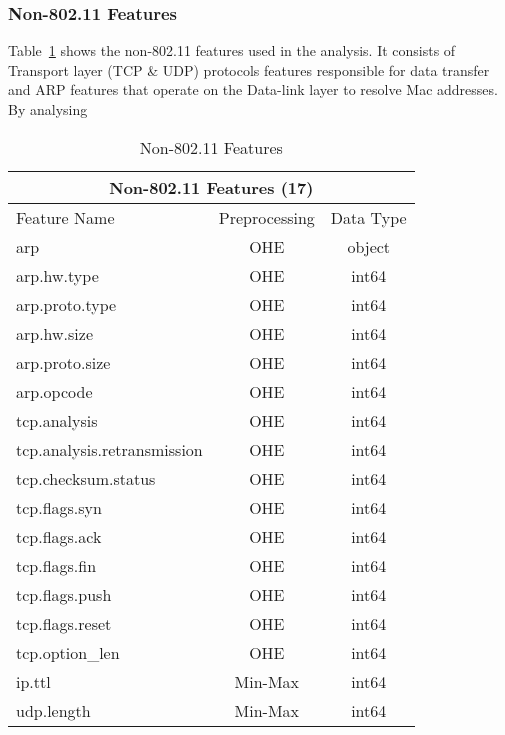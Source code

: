 \subsubsection{Non-802.11 Features}

Table~\ref{tab:non80211} shows the non-802.11 features used in the analysis. It consists of Transport layer (TCP \& UDP) protocols features responsible for data transfer and ARP features that operate on the Data-link layer to resolve Mac addresses. By analysing 

\begin{table}[H]
\begin{tabular}{lcc}
\hline
\multicolumn{3}{c}{\textbf{Non-802.11 Features (17)}} \\ \hline
Feature Name & Preprocessing & Data Type \\ \hline
arp & OHE & object \\
arp.hw.type & OHE & int64 \\
arp.proto.type & OHE & int64 \\
arp.hw.size & OHE & int64 \\
arp.proto.size & OHE & int64 \\
arp.opcode & OHE & int64 \\
tcp.analysis & OHE & int64 \\
tcp.analysis.retransmission & OHE & int64 \\
tcp.checksum.status & OHE & int64 \\
tcp.flags.syn & OHE & int64 \\
tcp.flags.ack & OHE & int64 \\
tcp.flags.fin & OHE & int64 \\
tcp.flags.push & OHE & int64 \\
tcp.flags.reset & OHE & int64 \\
tcp.option\_len & OHE & int64 \\
ip.ttl & Min-Max & int64 \\
udp.length & Min-Max & int64 \\ \hline
\end{tabular}
\caption{Non-802.11 Features}
\label{tab:non80211}
\end{table}
